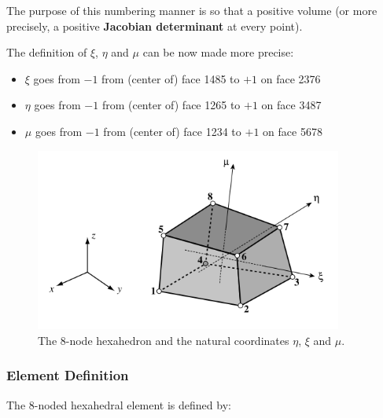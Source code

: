 \documentclass[10pt,b5paper,titlepage]{book}
\begin{document}
The purpose of this numbering manner is so that a positive volume (or more
precisely, a positive \textbf{Jacobian determinant} at every point).

The definition of $ \xi $, $ \eta $ and $ \mu $ can be now made more precise:

\begin{itemize}
    \item $ \xi $ goes from $ -1 $ from (center of) face 1485 to $ +1 $ on face 2376
    \item $ \eta $ goes from $ -1 $ from (center of) face 1265 to $ +1 $ on face 3487
    \item $ \mu $ goes from $ -1 $ from (center of) face 1234 to $ +1 $ on face 5678
\end{itemize}

\begin{figure}[ht]
    \centering
    \includegraphics[width=0.90\textwidth]{img/hex8-node-numbers.png}
    \caption{The 8-node hexahedron and the natural coordinates $ \eta $, $ \xi $
    and $ \mu $.}
    \label{fig:hex8-node-numbers-png}
\end{figure}


\subsubsection{Element Definition}

The 8-noded hexahedral element is defined by:
\end{document}
